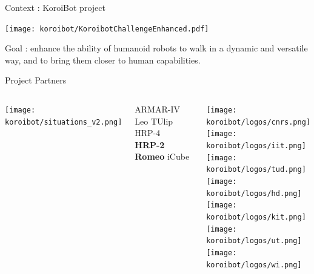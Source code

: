 \begin{frame}{Context : KoroiBot project}
\vspace*{-1.0cm}
\begin{center}
  \texttt{[image: koroibot/KoroibotChallengeEnhanced.pdf]}
\end{center}
Goal : enhance the ability of humanoid robots to walk in a dynamic and versatile way, and to bring them closer to human capabilities.
\end{frame}


\begin{frame}{Project Partners}
\vspace*{-0.7cm}
\begin{columns}
\begin{center}
  \texttt{[image: koroibot/situations\_v2.png]}
\end{center}
\vspace*{-0.5cm}
  \small{ \hspace*{0.3cm} ARMAR-IV \hspace*{0.4cm}  Leo \hspace*{0.4cm} TUlip \hspace*{0.6cm} HRP-4 }\\
  \small{ \hspace*{1.7cm} \textcolor{blue!50!black}{\textbf{HRP-2}} \hspace*{0.1cm} \textcolor{blue!50!black}{\textbf{Romeo}} \hspace*{0.3cm} iCube}
\begin{center}
  \texttt{[image: koroibot/logos/cnrs.png]}\\
  \texttt{[image: koroibot/logos/iit.png]}\\
  \texttt{[image: koroibot/logos/tud.png]}\\
  \texttt{[image: koroibot/logos/hd.png]}\\
  \texttt{[image: koroibot/logos/kit.png]}\\
  \texttt{[image: koroibot/logos/ut.png]}\\
  \texttt{[image: koroibot/logos/wi.png]}
\end{center}

\end{columns}
\end{frame}

